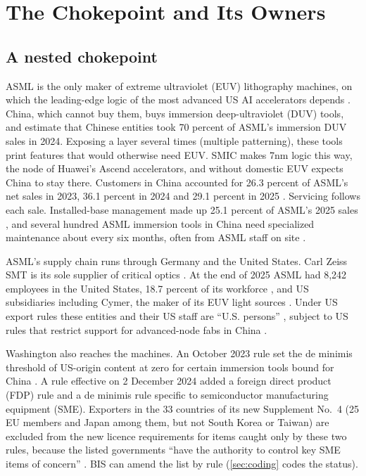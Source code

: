 \section{The Chokepoint and Its Owners}\label{sec:background}

\subsection{A nested chokepoint}

ASML is the only maker of extreme ultraviolet (EUV) lithography machines, on which the leading-edge logic of the most advanced US AI accelerators depends \citep{miller2022chip, asml2026annual}. China, which cannot buy them, buys immersion deep-ultraviolet (DUV) tools, and \citet{aei2026lithography} estimate that Chinese entities took 70 percent of ASML's immersion DUV sales in 2024. Exposing a layer several times (multiple patterning), these tools print features that would otherwise need EUV. SMIC makes 7nm logic this way, the node of Huawei's Ascend accelerators, and without domestic EUV \citet{allen2025deepseek} expects China to stay there. Customers in China accounted for 26.3 percent of ASML's net sales in 2023, 36.1 percent in 2024 and 29.1 percent in 2025 \citep{asml2026annual}. Servicing follows each sale. Installed-base management made up 25.1 percent of ASML's 2025 sales \citep{asml2026annual}, and several hundred ASML immersion tools in China need specialized maintenance about every six months, often from ASML staff on site \citep{aei2026lithography}.

ASML's supply chain runs through Germany and the United States. Carl Zeiss SMT is its sole supplier of critical optics \citep{asml2026annual}. At the end of 2025 ASML had 8,242 employees in the United States, 18.7 percent of its workforce \citep{asml2026annual}, and US subsidiaries including Cymer, the maker of its EUV light sources \citep{asml2026subsidiaries}. Under US export rules these entities and their US staff are ``U.S. persons'' \citep{ecfr2026usperson}, subject to US rules that restrict support for advanced-node fabs in China \citep{asml2026annual}.

Washington also reaches the machines. An October 2023 rule set the de minimis threshold of US-origin content at zero for certain immersion tools bound for China \citep{ecfr7344, bis2023sme}. A rule effective on 2 December 2024 added a foreign direct product (FDP) rule and a de minimis rule specific to semiconductor manufacturing equipment (SME). Exporters in the 33 countries of its new Supplement No.~4 (25 EU members and Japan among them, but not South Korea or Taiwan) are excluded from the new licence requirements for items caught only by these two rules, because the listed governments ``have the authority to control key SME items of concern'' \citep{bis2024fdpr}. BIS can amend the list by rule (\cref{sec:coding} codes the status).

